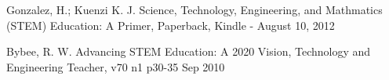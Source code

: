 \documentclass[
12pt,		%
openright,	%
twoside,  %
a4paper,			%
chapter=TITLE,		%
english,			%
french,				%
spanish,			%
brazil				%
]{USPSC-classe/USPSC}
\begin{document}
\begin{flushleft}
\begin{flushleft}
\begin{flushleft}
\begin{flushleft}
\begin{flushleft}
\begin{flushleft}
\begin{flushleft}
\begin{flushleft}
 Gonzalez, H.; Kuenzi K. J. Science, Technology, Engineering, and Mathmatics (STEM) Education: A Primer, Paperback, Kindle - August 10, 2012
\end{flushleft}


\end{flushleft}


\end{flushleft}


\end{flushleft}


\end{flushleft}


\end{flushleft}


\end{flushleft}


\end{flushleft}


\begin{flushleft}
\begin{flushleft}
\begin{flushleft}
\begin{flushleft}
\begin{flushleft}
\begin{flushleft}
\begin{flushleft}
\begin{flushleft}
[BYBEE, 2010] Bybee, R. W. Advancing STEM Education: A 2020 Vision, Technology and Engineering Teacher, v70 n1 p30-35 Sep 2010
\end{flushleft}


\end{flushleft}


\end{flushleft}


\end{flushleft}


\end{flushleft}


\end{flushleft}


\end{flushleft}


\end{flushleft}
\end{document}
